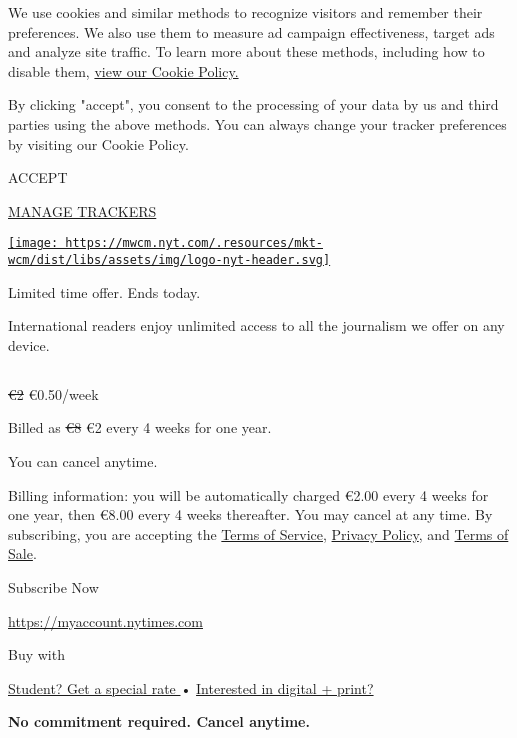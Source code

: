 We use cookies and similar methods to recognize visitors and remember
their preferences. We also use them to measure ad campaign
effectiveness, target ads and analyze site traffic. To learn more about
these methods, including how to disable them,
\href{https://nytimes.com/cookie-policy}{view our Cookie Policy.}

By clicking "accept", you consent to the processing of your data by us
and third parties using the above methods. You can always change your
tracker preferences by visiting our Cookie Policy.

ACCEPT

\href{https://nytimes.com/cookie-policy}{MANAGE TRACKERS}

\href{https://www.nytimes.com/}{\texttt{[image: https://mwcm.nyt.com/.resources/mkt-wcm/dist/libs/assets/img/logo-nyt-header.svg]}}

Limited time offer. Ends today.

International readers enjoy unlimited access to all the journalism we
offer on any device.

\subsection{}

\sout{€2} €0.50/week

Billed as \sout{€8} €2 every 4 weeks for one year.

You can cancel anytime.

Billing information: you will be automatically charged €2.00 every 4
weeks for one year, then €8.00 every 4 weeks thereafter. You may cancel
at any time. By subscribing, you are accepting the
\href{https://www.nytimes.com/content/help/rights/terms/terms-of-service.html}{Terms
of Service},
\href{https://www.nytimes.com/content/help/rights/privacy/policy/privacy-policy.html}{Privacy
Policy}, and
\href{https://www.nytimes.com/content/help/rights/sale/terms-of-sale.html}{Terms
of Sale}.

\href{https://myaccount.nytimes.com/get-started?OC=20000215740\&campaignId=37WXW}{}

Subscribe Now

\url{https://myaccount.nytimes.com}

Buy with

\href{/subscription/education?campaignId=6JQ7F}{Student? Get a special
rate } • \href{https://subscribe.inyt.com/?campaignId=6JQ7J}{Interested
in digital + print? }

\textbf{No commitment required. Cancel anytime.}

